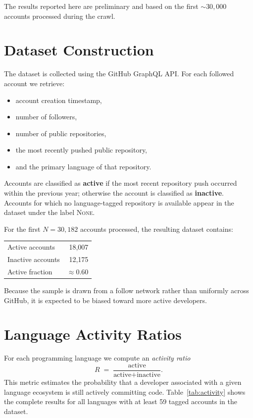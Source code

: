 \documentclass[12pt,a4paper]{article}
\begin{document}
The results reported here are preliminary and based on the first $\sim30{,}000$
accounts processed during the crawl.

\section{Dataset Construction}

The dataset is collected using the GitHub GraphQL API. For each followed account
we retrieve:
\begin{itemize}
\item account creation timestamp,
\item number of followers,
\item number of public repositories,
\item the most recently pushed public repository,
\item and the primary language of that repository.
\end{itemize}

Accounts are classified as \textbf{active} if the most recent repository push
occurred within the previous year; otherwise the account is classified as
\textbf{inactive}. Accounts for which no language-tagged repository is available
appear in the dataset under the label \textsc{None}.

For the first $N=30{,}182$ accounts processed, the resulting dataset contains:

\begin{center}
\begin{tabular}{lr}
\toprule
Active accounts & 18,007 \\
Inactive accounts & 12,175 \\
\midrule
Active fraction & $\approx 0.60$ \\
\bottomrule
\end{tabular}
\end{center}

Because the sample is drawn from a follow network rather than uniformly across
GitHub, it is expected to be biased toward more active developers.

\section{Language Activity Ratios}

For each programming language we compute an \emph{activity ratio}
\[
R \;=\; \frac{\text{active}}{\text{active}+\text{inactive}}.
\]
This metric estimates the probability that a developer associated with a given
language ecosystem is still actively committing code. Table~\ref{tab:activity}
shows the complete results for all languages with at least 59 tagged accounts in
the dataset.
\end{document}
